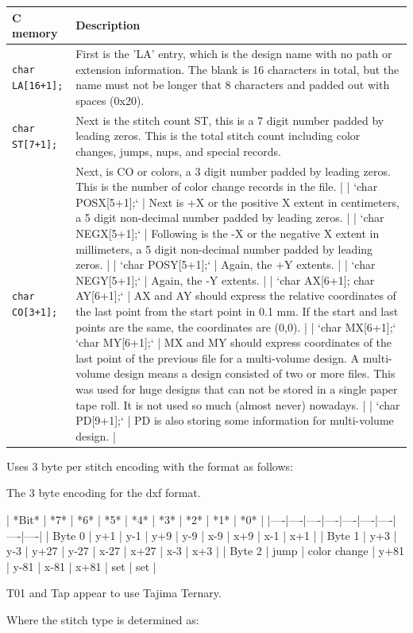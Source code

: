 \documentclass[a4paper, 11pt]{report}
\begin{document}
\begin{longtable}{l p{10cm}}
\textbf{C memory} & \textbf{Description} \\
\hline
\texttt{char LA[16+1];} & First is the 'LA' entry, which is the design name with no path or extension information. The blank is 16 characters in total, but the name must not be longer that 8 characters and padded out with spaces (0x20). \\
\texttt{char ST[7+1];} & Next is the stitch count ST, this is a 7 digit number padded by leading zeros. This is the total stitch count including color changes, jumps, nups, and special records. \\
\texttt{char CO[3+1];} & Next, is CO or colors, a 3 digit number padded by leading zeros. This is the number of color change records in the file. |
| `char POSX[5+1];` | Next is +X or the positive X extent in centimeters, a 5 digit non-decimal number padded by leading zeros. |
| `char NEGX[5+1];` | Following is the -X or the negative X extent in millimeters, a 5 digit non-decimal number padded by leading zeros. |
| `char POSY[5+1];` | Again, the +Y extents. |
| `char NEGY[5+1];` | Again, the -Y extents. |
| `char AX[6+1]; char AY[6+1];` | AX and AY should express the relative coordinates of the last point from the start point in 0.1 mm. If the start and last points are the same, the coordinates are (0,0). |
| `char MX[6+1];` `char MY[6+1];` | MX and MY should express coordinates of the last point of the previous file for a multi-volume design. A multi-volume design means a design consisted of two or more files. This was used for huge designs that can not be stored in a single paper tape roll. It is not used so much (almost never) nowadays. |
| `char PD[9+1];` | PD is also storing some information for multi-volume design. |
\end{longtable}

Uses 3 byte per stitch encoding with the format as follows:

The 3 byte encoding for the dxf format.

| *Bit* | *7* | *6* | *5* | *4* | *3* | *2* | *1* | *0* |
|----|----|----|----|----|----|----|----|----|
| Byte 0 | y+1 | y-1 | y+9 | y-9 | x-9 | x+9 | x-1 | x+1 |
| Byte 1 | y+3 | y-3 | y+27 | y-27 | x-27 | x+27 | x-3 | x+3 |
| Byte 2 | jump | color change | y+81 | y-81 | x-81 | x+81 | set | set |

T01 and Tap appear to use Tajima Ternary.
 
Where the stitch type is determined as:
\end{document}

